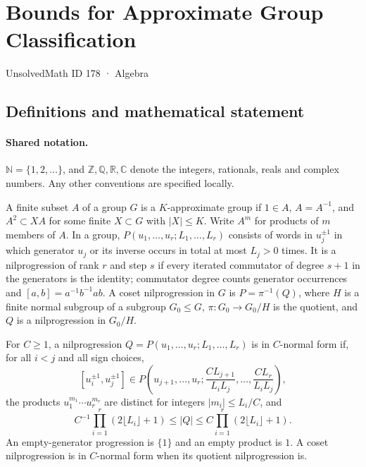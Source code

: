 \documentclass[11pt]{article}
\begin{document}
\setcounter{section}{177}
\section{Bounds for Approximate Group Classification}\label{178}
{\small\sffamily UnsolvedMath ID 178 · Algebra}
\subsection{Definitions and mathematical statement}

\paragraph{Shared notation.}$\mathbb N=\{1,2,\ldots\}$, and $\mathbb Z,\mathbb Q,\mathbb R,\mathbb C$ denote the integers, rationals, reals and complex numbers. Any other conventions are specified locally.


A finite subset $A$ of a group $G$ is a $K$-approximate group if $1\in A$, $A=A^{-1}$, and $A^2\subset XA$ for some finite $X\subset G$ with $|X|\leq K$. Write $A^m$ for products of $m$ members of $A$. In a group, $P(u_1,\ldots,u_r;L_1,\ldots,L_r)$ consists of words in $u_j^{\pm1}$ in which generator $u_j$ or its inverse occurs in total at most $L_j>0$ times. It is a nilprogression of rank $r$ and step $s$ if every iterated commutator of degree $s+1$ in the generators is the identity; commutator degree counts generator occurrences and $[a,b]=a^{-1}b^{-1}ab$. A coset nilprogression in $G$ is $P=\pi^{-1}(Q)$, where $H$ is a finite normal subgroup of a subgroup $G_0\leq G$, $\pi:G_0\to G_0/H$ is the quotient, and $Q$ is a nilprogression in $G_0/H$.

For $C\geq1$, a nilprogression $Q=P(u_1,\ldots,u_r;L_1,\ldots,L_r)$ is in $C$-normal form if, for all $i<j$ and all sign choices,
\[
 [u_i^{\pm1},u_j^{\pm1}]\in
 P\left(u_{j+1},\ldots,u_r;\frac{CL_{j+1}}{L_iL_j},\ldots,\frac{CL_r}{L_iL_j}\right),
\]
the products $u_1^{m_1}\cdots u_r^{m_r}$ are distinct for integers $|m_i|\leq L_i/C$, and
\[
 C^{-1}\prod_{i=1}^r(2\lfloor L_i\rfloor+1)\leq|Q|\leq C\prod_{i=1}^r(2\lfloor L_i\rfloor+1).
\]
An empty-generator progression is $\{1\}$ and an empty product is $1$. A coset nilprogression is in $C$-normal form when its quotient nilprogression is.
\end{document}
